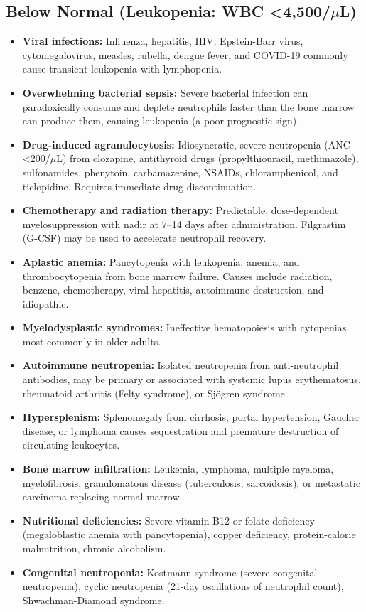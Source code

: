 \subsection*{Below Normal (Leukopenia: WBC <4,500/$\mu$L)}
\begin{itemize}
  \item \textbf{Viral infections:} Influenza, hepatitis, HIV, Epstein-Barr virus, cytomegalovirus, measles, rubella, dengue fever, and COVID-19 commonly cause transient leukopenia with lymphopenia.
  \item \textbf{Overwhelming bacterial sepsis:} Severe bacterial infection can paradoxically consume and deplete neutrophils faster than the bone marrow can produce them, causing leukopenia (a poor prognostic sign).
  \item \textbf{Drug-induced agranulocytosis:} Idiosyncratic, severe neutropenia (ANC <200/$\mu$L) from clozapine, antithyroid drugs (propylthiouracil, methimazole), sulfonamides, phenytoin, carbamazepine, NSAIDs, chloramphenicol, and ticlopidine. Requires immediate drug discontinuation.
  \item \textbf{Chemotherapy and radiation therapy:} Predictable, dose-dependent myelosuppression with nadir at 7--14 days after administration. Filgrastim (G-CSF) may be used to accelerate neutrophil recovery.
  \item \textbf{Aplastic anemia:} Pancytopenia with leukopenia, anemia, and thrombocytopenia from bone marrow failure. Causes include radiation, benzene, chemotherapy, viral hepatitis, autoimmune destruction, and idiopathic.
  \item \textbf{Myelodysplastic syndromes:} Ineffective hematopoiesis with cytopenias, most commonly in older adults.
  \item \textbf{Autoimmune neutropenia:} Isolated neutropenia from anti-neutrophil antibodies, may be primary or associated with systemic lupus erythematosus, rheumatoid arthritis (Felty syndrome), or Sj\"{o}gren syndrome.
  \item \textbf{Hypersplenism:} Splenomegaly from cirrhosis, portal hypertension, Gaucher disease, or lymphoma causes sequestration and premature destruction of circulating leukocytes.
  \item \textbf{Bone marrow infiltration:} Leukemia, lymphoma, multiple myeloma, myelofibrosis, granulomatous disease (tuberculosis, sarcoidosis), or metastatic carcinoma replacing normal marrow.
  \item \textbf{Nutritional deficiencies:} Severe vitamin B12 or folate deficiency (megaloblastic anemia with pancytopenia), copper deficiency, protein-calorie malnutrition, chronic alcoholism.
  \item \textbf{Congenital neutropenia:} Kostmann syndrome (severe congenital neutropenia), cyclic neutropenia (21-day oscillations of neutrophil count), Shwachman-Diamond syndrome.
\end{itemize}

